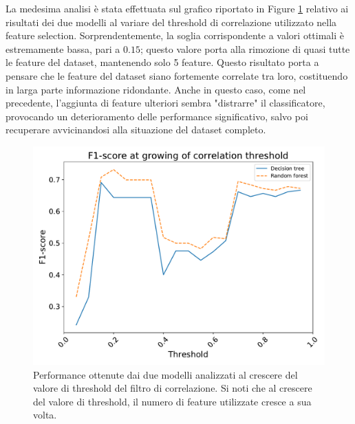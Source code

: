 La medesima analisi è stata effettuata sul grafico riportato in Figure \ref{fig:corr-perf} relativo ai risultati dei due modelli al variare del threshold di correlazione utilizzato nella feature selection. Sorprendentemente, la soglia corrispondente a valori ottimali è estremamente bassa, pari a $0.15$; questo valore porta alla rimozione di quasi tutte le feature del dataset, mantenendo solo 5 feature. Questo risultato porta a pensare che le feature del dataset siano fortemente correlate tra loro, costituendo in larga parte informazione ridondante. Anche in questo caso, come nel precedente, l'aggiunta di feature ulteriori sembra "distrarre" il classificatore, provocando un deterioramento delle performance significativo, salvo poi recuperare avvicinandosi alla situazione del dataset completo.
\begin{figure}
	\centering
	\includegraphics[width=1\linewidth]{images/corr-perf}
	\caption{Performance ottenute dai due modelli analizzati al crescere del valore di threshold del filtro di correlazione. Si noti che al crescere del valore di threshold, il numero di feature utilizzate cresce a sua volta.}
	\label{fig:corr-perf}
\end{figure}


